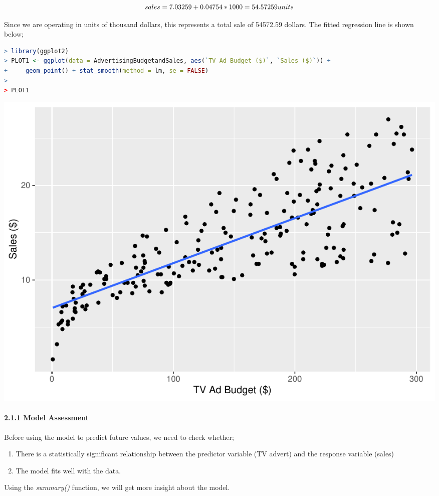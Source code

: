 \documentclass[
]{article}
\begin{document}
\[sales=7.03259 +0.04754*1000 =54.57259\space units\]

Since we are operating in units of thousand dollars, this represents a
total sale of 54572.59 dollars. The fitted regression line is shown
below;

\begin{lstlisting}[language=R]
> library(ggplot2)
> PLOT1 <- ggplot(data = AdvertisingBudgetandSales, aes(`TV Ad Budget ($)`, `Sales ($)`)) +
+     geom_point() + stat_smooth(method = lm, se = FALSE)
> 
> PLOT1
\end{lstlisting}

\includegraphics{LinearRegression_files/figure-latex/unnamed-chunk-3-1.pdf}

\hypertarget{model-assessment}{%
\paragraph{\texorpdfstring{2.1.1 Model
Assessment}{2.1.1 Model Assessment }}\label{model-assessment}}

Before using the model to predict future values, we need to check
whether;

\begin{enumerate}
\def\labelenumi{\arabic{enumi}.}
\item
  There is a statistically significant relationship between the
  predictor variable (TV advert) and the response variable (sales)
\item
  The model fits well with the data.
\end{enumerate}

Using the \emph{summary()} function, we will get more insight about the
model.
\end{document}
